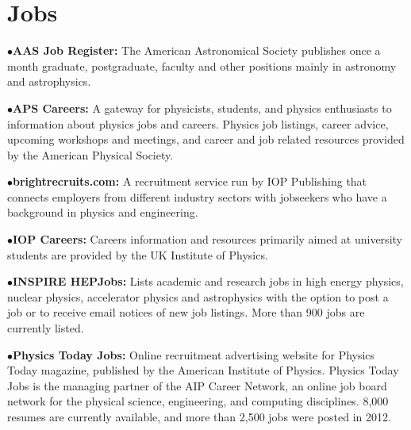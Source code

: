\medskip




\section{Jobs} %

\item{$\bullet$}{\bf AAS Job Register:} 
The American Astronomical Society publishes once a month graduate, postgraduate, faculty and other positions mainly in astronomy and astrophysics. 
	\item{} 

\item{$\bullet$}{\bf APS Careers:} 
A gateway for physicists, students, and physics enthusiasts to information about physics jobs and careers. Physics job listings, career advice, upcoming workshops and meetings, and career and job related resources provided by the American Physical Society.
	\item{} 

\medskip

\item{$\bullet$}{\bf brightrecruits.com:} A recruitment service run by IOP Publishing that connects employers from different industry sectors with jobseekers who have a background in physics and engineering.
	\item{}

\medskip

\item{$\bullet$}{\bf IOP Careers:} 
Careers information and resources primarily aimed at university students are provided by the UK Institute of Physics.
	\item{}

\medskip

\item{$\bullet$}{\bf INSPIRE HEPJobs:} 
Lists academic and research jobs in high energy physics, nuclear physics, accelerator physics and astrophysics with the option to post a job or to receive email notices of new job listings. More than 900 jobs are currently listed.
	\item{}

\medskip

\item{$\bullet$}{\bf Physics Today Jobs:} 
Online recruitment advertising website for Physics Today magazine, published by the American Institute of Physics. Physics Today Jobs is the managing partner of the AIP Career Network, an online job board network for the physical science, engineering, and computing disciplines. 8,000 resumes are currently available, and more than 2,500 jobs were posted in 2012.
	\item{}

